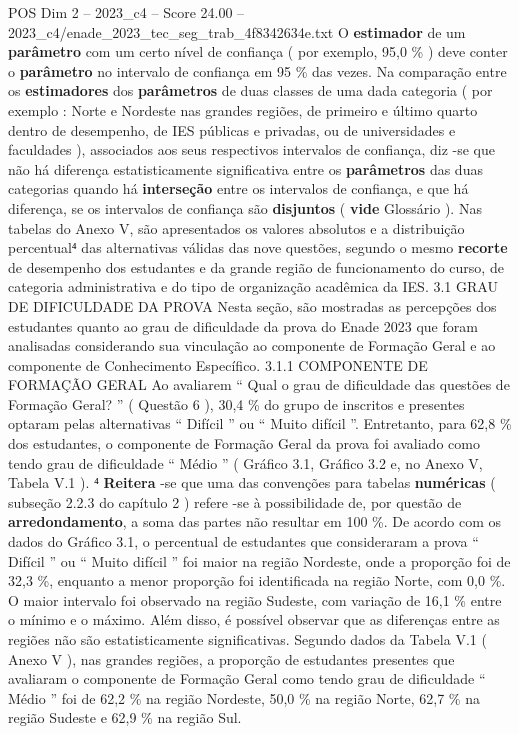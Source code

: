 \begin{textsample}{POS Dim 2 – 2023\_c4 – Score 24.00 – 2023\_c4/enade\_2023\_tec\_seg\_trab\_4f8342634e.txt}
O \textbf{estimador} de um \textbf{parâmetro} com um certo nível de confiança ( por exemplo, 95,0 \% ) deve conter o \textbf{parâmetro} no intervalo de confiança em 95 \% das vezes.
Na comparação entre os \textbf{estimadores} dos \textbf{parâmetros} de duas classes de uma dada categoria ( por exemplo : Norte e Nordeste nas grandes regiões, de primeiro e último quarto dentro de desempenho, de IES públicas e privadas, ou de universidades e faculdades ), associados aos seus respectivos intervalos de confiança, diz -se que não há diferença estatisticamente significativa entre os \textbf{parâmetros} das duas categorias quando há \textbf{interseção} entre os intervalos de confiança, e que há diferença, se os intervalos de confiança são \textbf{disjuntos} ( \textbf{vide} Glossário ).
Nas tabelas do Anexo V, são apresentados os valores absolutos e a distribuição percentual⁴ das alternativas válidas das nove questões, segundo o mesmo \textbf{recorte} de desempenho dos estudantes e da grande região de funcionamento do curso, de categoria administrativa e do tipo de organização acadêmica da IES. 3.1 GRAU DE DIFICULDADE DA PROVA Nesta seção, são mostradas as percepções dos estudantes quanto ao grau de dificuldade da prova do Enade 2023 que foram analisadas considerando sua vinculação ao componente de Formação Geral e ao componente de Conhecimento Específico. 3.1.1 COMPONENTE DE FORMAÇÃO GERAL Ao avaliarem “ Qual o grau de dificuldade das questões de Formação Geral? ” ( Questão 6 ), 30,4 \% do grupo de inscritos e presentes optaram pelas alternativas “ Difícil ” ou “ Muito difícil ”.
Entretanto, para 62,8 \% dos estudantes, o componente de Formação Geral da prova foi avaliado como tendo grau de dificuldade “ Médio ” ( Gráfico 3.1, Gráfico 3.2 e, no Anexo V, Tabela V.1 ). ⁴ \textbf{Reitera} -se que uma das convenções para tabelas \textbf{numéricas} ( subseção 2.2.3 do capítulo 2 ) refere -se à possibilidade de, por questão de \textbf{arredondamento}, a soma das partes não resultar em 100 \%.
De acordo com os dados do Gráfico 3.1, o percentual de estudantes que consideraram a prova “ Difícil ” ou “ Muito difícil ” foi maior na região Nordeste, onde a proporção foi de 32,3 \%, enquanto a menor proporção foi identificada na região Norte, com 0,0 \%.
O maior intervalo foi observado na região Sudeste, com variação de 16,1 \% entre o mínimo e o máximo.
Além disso, é possível observar que as diferenças entre as regiões não são estatisticamente significativas.
Segundo dados da Tabela V.1 ( Anexo V ), nas grandes regiões, a proporção de estudantes presentes que avaliaram o componente de Formação Geral como tendo grau de dificuldade “ Médio ” foi de 62,2 \% na região Nordeste, 50,0 \% na região Norte, 62,7 \% na região Sudeste e 62,9 \% na região Sul.

\end{textsample}
